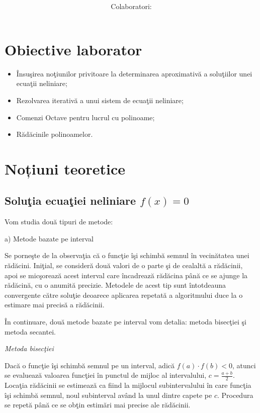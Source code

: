 \documentclass{exam}
\title{
	\textmd{\textbf{\MNLabTitle}}
	\author{Colaboratori: \MNAuthor}
}
\begin{document}
\begin{coverpages}

	\maketitle
	\tableofcontents

\end{coverpages}

\section{Obiective laborator}

\begin{itemize}
	\item Însuşirea noţiunilor privitoare la determinarea aproximativă a soluţiilor unei ecuaţii neliniare;
	\item Rezolvarea iterativă a unui sistem de ecuaţii neliniare;
	\item Comenzi Octave pentru lucrul cu polinoame;
	\item Rădăcinile polinoamelor.
\end{itemize}

\section{Noțiuni teoretice}

\subsection{Soluţia ecuaţiei neliniare $f(x) = 0$}

Vom studia două tipuri de metode:

a) Metode bazate pe interval

Se porneşte de la observaţia că o funcţie îşi schimbă semnul în vecinătatea unei rădăcini. Iniţial, se consideră două valori de o parte şi de cealaltă a rădăcinii, apoi se micşorează acest interval care încadrează rădăcina până ce se ajunge la rădăcină, cu o anumită precizie. Metodele de acest tip sunt întotdeauna convergente către soluţie deoarece aplicarea repetată a algoritmului duce la o estimare mai precisă a rădăcinii.

În continuare, două metode bazate pe interval vom detalia: metoda bisecţiei şi metoda secantei.

\textit{Metoda bisecţiei}

Dacă o funcţie îşi schimbă semnul pe un interval, adică $f(a)\cdot f(b)<0$, atunci se evaluează valoarea funcţiei în punctul de mijloc al intervalului, $c = \frac{a + b}{2}$. Locaţia rădăcinii se estimează ca fiind la mijlocul subintervalului în care funcţia îşi schimbă semnul, noul subinterval având la unul dintre capete pe $c$. Procedura se repetă până ce se obţin estimări mai precise ale rădăcinii.
\end{document}
